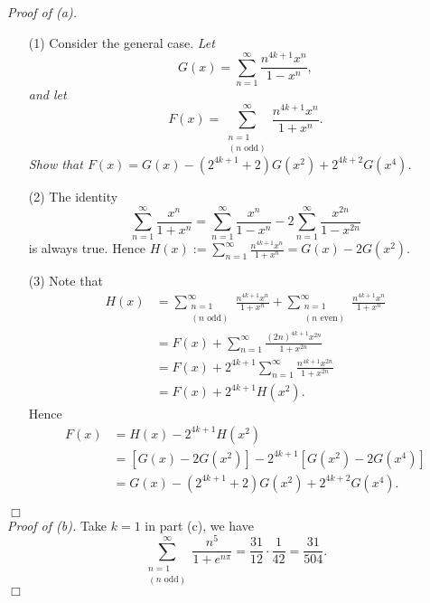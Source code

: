 \documentclass{article}
\begin{document}
\emph{Proof of (a).}
\begin{enumerate}
\item[(1)]
  Consider the general case.
  \emph{Let
  \[
    G(x) = \sum_{n=1}^{\infty} \frac{n^{4k+1} x^n}{1-x^n},
  \]
  and let
  \[
    F(x) = \sum_{\substack{n=1 \\ (\text{$n$ odd})}}^{\infty} \frac{n^{4k+1} x^n}{1+x^n}.
  \]
  Show that $F(x) = G(x) - (2^{4k+1} + 2)G(x^2) + 2^{4k+2} G(x^4)$.}

\item[(2)]
  The identity
  \[
    \sum_{n=1}^{\infty} \frac{x^n}{1+x^n}
    = \sum_{n=1}^{\infty} \frac{x^n}{1-x^n}
      - 2 \sum_{n=1}^{\infty} \frac{x^{2n}}{1-x^{2n}}
  \]
  is always true.
  Hence $H(x) := \sum_{n=1}^{\infty} \frac{n^{4k+1} x^n}{1+x^n} = G(x) - 2G(x^2)$.

\item[(3)]
  Note that
  \begin{align*}
    H(x)
    &=
    \sum_{\substack{n=1 \\ (\text{$n$ odd})}}^{\infty} \frac{n^{4k+1} x^n}{1+x^n}
    + \sum_{\substack{n=1 \\ (\text{$n$ even})}}^{\infty} \frac{n^{4k+1} x^n}{1+x^n} \\
    &=
    F(x) + \sum_{n=1}^{\infty} \frac{(2n)^{4k+1} x^{2n}}{1+x^{2n}} \\
    &=
    F(x) + 2^{4k+1} \sum_{n=1}^{\infty} \frac{n^{4k+1} x^{2n}}{1+x^{2n}} \\
    &=
    F(x) + 2^{4k+1}H(x^2).
  \end{align*}
  Hence
  \begin{align*}
    F(x)
    &= H(x) - 2^{4k+1}H(x^2) \\
    &= [G(x) - 2G(x^2)] - 2^{4k+1}[G(x^2) - 2G(x^4)] \\
    &= G(x) - (2^{4k+1} + 2)G(x^2) + 2^{4k+2}G(x^4).
  \end{align*}
\end{enumerate}
$\Box$ \\



\emph{Proof of (b).}
  Take $k = 1$ in part (c), we have
  \[
    \sum_{\substack{n=1 \\ (\text{$n$ odd})}}^{\infty} \frac{n^5}{1+e^{n\pi}}
    = \frac{31}{12} \cdot \frac{1}{42}
    = \frac{31}{504}.
  \]
$\Box$ \\
\end{document}
